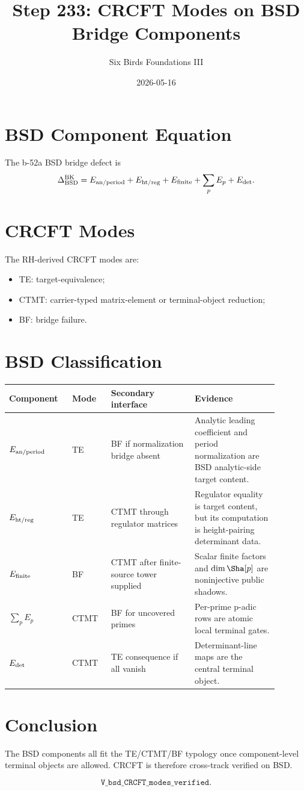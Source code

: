 \documentclass{article}
\title{Step 233: CRCFT Modes on BSD Bridge Components}
\author{Six Birds Foundations III}
\date{2026-05-16}
\begin{document}
\maketitle

\section{BSD Component Equation}

The b-52a BSD bridge defect is
\[
  \Delta_{\rm BSD}^{\rm BK}
  =
  E_{\rm an/period}
  + E_{\rm ht/reg}
  + E_{\rm finite}
  + \sum_p E_p
  + E_{\rm det}.
\]

\section{CRCFT Modes}

The RH-derived CRCFT modes are:
\begin{itemize}
\item TE: target-equivalence;
\item CTMT: carrier-typed matrix-element or terminal-object reduction;
\item BF: bridge failure.
\end{itemize}

\section{BSD Classification}

\begin{center}
\begin{tabular}{p{0.19\linewidth}p{0.13\linewidth}p{0.29\linewidth}p{0.28\linewidth}}
\toprule
Component & Mode & Secondary interface & Evidence\\
\midrule
\(E_{\rm an/period}\) & TE & BF if normalization bridge absent & Analytic leading coefficient and period normalization are BSD analytic-side target content.\\
\(E_{\rm ht/reg}\) & TE & CTMT through regulator matrices & Regulator equality is target content, but its computation is height-pairing determinant data.\\
\(E_{\rm finite}\) & BF & CTMT after finite-source tower supplied & Scalar finite factors and \(\dim\Sha[p]\) are noninjective public shadows.\\
\(\sum_p E_p\) & CTMT & BF for uncovered primes & Per-prime p-adic rows are atomic local terminal gates.\\
\(E_{\rm det}\) & CTMT & TE consequence if all vanish & Determinant-line maps are the central terminal object.\\
\bottomrule
\end{tabular}
\end{center}

\section{Conclusion}

The BSD components all fit the TE/CTMT/BF typology once component-level terminal objects are allowed. CRCFT is therefore cross-track verified on BSD.

\[
  \boxed{\texttt{V\_bsd\_CRCFT\_modes\_verified}.}
\]
\end{document}
